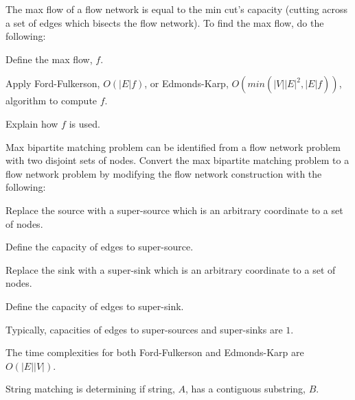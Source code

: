 
        The max flow of a flow network is equal to the min cut's capacity (cutting across a set of edges which bisects the flow network). To find the max flow, do the following:

        \startitemize[n]
            \item Define the max flow, $f$.
            \item Apply Ford-Fulkerson, $O(|E|f)$, or Edmonds-Karp, $O(min(|V||E|^{2}, |E|f))$, algorithm to compute $f$.
            \item Explain how $f$ is used.
        \stopitemize


        Max bipartite matching problem can be identified from a flow network problem with two disjoint sets of nodes. Convert the max bipartite matching problem to a flow network problem by modifying the flow network construction with the following:
        \startitemize[n]
            \item Replace the source with a super-source which is an arbitrary coordinate to a set of nodes.
            \item Define the capacity of edges to super-source.
            \item Replace the sink with a super-sink which is an arbitrary coordinate to a set of nodes.
            \item Define the capacity of edges to super-sink.
        \stopitemize

        Typically, capacities of edges to super-sources and super-sinks are $1$.

        The time complexities for both Ford-Fulkerson and Edmonds-Karp are $O(|E||V|)$.

\subject{String Matching} %

    String matching is determining if string, $A$, has a contiguous substring, $B$.


        

\subject{Linear Programming} %

\subject{Intractability} %